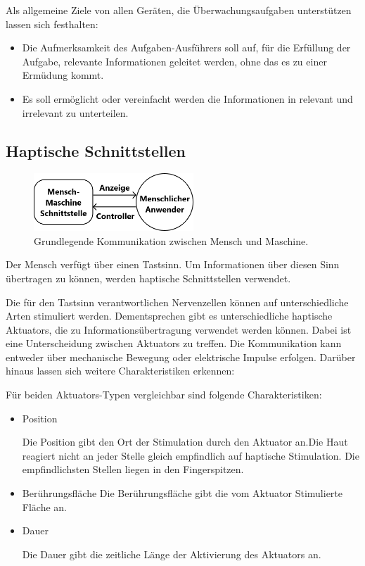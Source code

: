 \documentclass{llncs}					%
\begin{document}
Als allgemeine Ziele von allen Geräten, die Überwachungsaufgaben unterstützen lassen sich festhalten:
\begin{itemize}
	\item Die Aufmerksamkeit  des Aufgaben-Ausführers soll auf, für die Erfüllung der Aufgabe, relevante Informationen geleitet werden, ohne das es zu einer Ermüdung kommt.
	\item Es soll ermöglicht oder vereinfacht werden die Informationen in relevant und irrelevant zu unterteilen.
\end{itemize}

\subsection{Haptische Schnittstellen}

\begin{figure}[htbp]
	\begin{center}
		\includegraphics[width = 6cm]{Grafiken/14-Mensch-Maschine.png}
		\caption{Grundlegende Kommunikation zwischen Mensch und Maschine.\cite{Tan:2005:TDS:1198555.1198611}}
		\label{14-Mensch-Maschine}
	\end{center}
\end{figure}

Der Mensch verfügt über einen Tastsinn. Um Informationen über diesen Sinn übertragen zu können, werden haptische Schnittstellen verwendet. 

 
Die für den Tastsinn verantwortlichen Nervenzellen können auf unterschiedliche Arten stimuliert werden. Dementsprechen gibt es unterschiedliche haptische \glspl{Aktuator}, die zu Informationsübertragung verwendet werden können. Dabei ist eine Unterscheidung zwischen \glspl{Aktuator} zu treffen. Die Kommunikation kann entweder über mechanische Bewegung oder elektrische Impulse erfolgen. Darüber hinaus lassen sich weitere Charakteristiken erkennen:

Für beiden \glspl{Aktuator}-Typen vergleichbar sind folgende Charakteristiken:
\begin{itemize}
	\item Position
	
	Die Position gibt den Ort der Stimulation durch den Aktuator an.Die Haut reagiert nicht an jeder Stelle gleich empfindlich auf haptische Stimulation\cite[S.~91]{doi:10.1518/001872008X250638}.
	Die empfindlichsten Stellen liegen in den Fingerspitzen.
	
	\item Berührungsfläche
	Die Berührungsfläche gibt die vom Aktuator Stimulierte Fläche an.
	
	\item Dauer
	
	Die Dauer gibt die zeitliche Länge der Aktivierung des Aktuators an.
\end{itemize}
\end{document}
